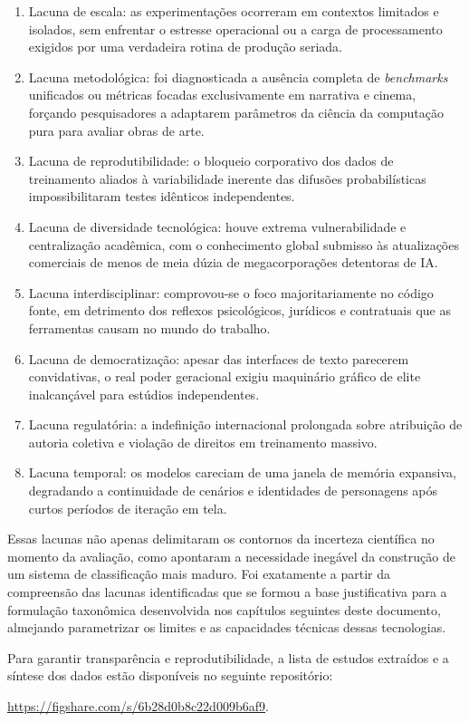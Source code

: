 \begin{enumerate}
    \item Lacuna de escala: as experimentações ocorreram em contextos limitados e isolados, sem enfrentar o estresse operacional ou a carga de processamento exigidos por uma verdadeira rotina de produção seriada.
    \item Lacuna metodológica: foi diagnosticada a ausência completa de \textit{benchmarks} unificados ou métricas focadas exclusivamente em narrativa e cinema, forçando pesquisadores a adaptarem parâmetros da ciência da computação pura para avaliar obras de arte.
    \item Lacuna de reprodutibilidade: o bloqueio corporativo dos dados de treinamento aliados à variabilidade inerente das difusões probabilísticas impossibilitaram testes idênticos independentes.
    \item Lacuna de diversidade tecnológica: houve extrema vulnerabilidade e centralização acadêmica, com o conhecimento global submisso às atualizações comerciais de menos de meia dúzia de megacorporações detentoras de IA.
    \item Lacuna interdisciplinar: comprovou-se o foco majoritariamente no código fonte, em detrimento dos reflexos psicológicos, jurídicos e contratuais que as ferramentas causam no mundo do trabalho.
    \item Lacuna de democratização: apesar das interfaces de texto parecerem convidativas, o real poder geracional exigiu maquinário gráfico de elite inalcançável para estúdios independentes.
    \item Lacuna regulatória: a indefinição internacional prolongada sobre atribuição de autoria coletiva e violação de direitos em treinamento massivo.
    \item Lacuna temporal: os modelos careciam de uma janela de memória expansiva, degradando a continuidade de cenários e identidades de personagens após curtos períodos de iteração em tela.
\end{enumerate}

Essas lacunas não apenas delimitaram os contornos da incerteza científica no momento da avaliação, como apontaram a necessidade inegável da construção de um sistema de classificação mais maduro. Foi exatamente a partir da compreensão das lacunas identificadas que se formou a base justificativa para a formulação taxonômica desenvolvida nos capítulos seguintes deste documento, almejando parametrizar os limites e as capacidades técnicas dessas tecnologias.

Para garantir transparência e reprodutibilidade, a lista de estudos extraídos e a síntese dos dados estão disponíveis no seguinte repositório:

\url{https://figshare.com/s/6b28d0b8c22d009b6af9}.